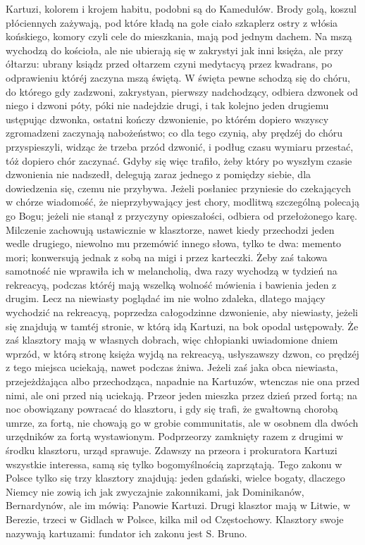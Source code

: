 \documentclass{book}
\begin{document}
Kartuzi, kolorem i krojem habitu, podobni są do Kamedułów. Brody golą, koszul płóciennych zażywają, pod które kładą na gołe ciało szkaplerz ostry z włósia końskiego, komory czyli cele do mieszkania, mają pod jednym dachem. Na mszą wychodzą do kościoła, ale nie ubierają się w zakrystyi jak inni księża, ale przy ółtarzu: ubrany ksiądz przed ołtarzem czyni medytacyą przez kwadrans, po odprawieniu któréj zaczyna mszą świętą. W święta pewne schodzą się do chóru, do którego gdy zadzwoni, zakrystyan, pierwszy nadchodzący, odbiera dzwonek od niego i dzwoni póty, póki nie nadejdzie drugi, i tak kolejno jeden drugiemu ustępując dzwonka, ostatni kończy dzwonienie, po którém dopiero wszyscy zgromadzeni zaczynają nabożeństwo; co dla tego czynią, aby prędzéj do chóru przyspieszyli, widząc że trzeba przód dzwonić, i podług czasu wymiaru przestać, tóż dopiero chór zaczynać. Gdyby się więc trafiło, żeby który po wyszłym czasie dzwonienia nie nadszedł, delegują zaraz jednego z pomiędzy siebie, dla dowiedzenia się, czemu nie przybywa. Jeżeli posłaniec przyniesie do czekających w chórze wiadomość, że nieprzybywający jest chory, modlitwą szczególną polecają go Bogu; jeżeli nie stanął z przyczyny opieszałości, odbiera od przełożonego karę. Milczenie zachowują ustawicznie w klasztorze, nawet kiedy przechodzi jeden wedle drugiego, niewolno mu przemówić innego słowa, tylko te dwa: memento mori; konwersują jednak z sobą na migi i przez karteczki. Żeby zaś takowa samotność nie wprawiła ich w melancholią, dwa razy wychodzą w tydzień na rekreacyą, podczas któréj mają wszelką wolność mówienia i bawienia jeden z drugim. Lecz na niewiasty poglądać im nie wolno zdaleka, dlatego mający wychodzić na rekreacyą, poprzedza całogodzinne dzwonienie, aby niewiasty, jeżeli się znajdują w tamtéj stronie, w którą idą Kartuzi, na bok opodal ustępowały. Że zaś klasztory mają w własnych dobrach, więc chłopianki uwiadomione dniem wprzód, w którą stronę księża wyjdą na rekreacyą, usłyszawszy dzwon, co prędzéj z tego miejsca uciekają, nawet podczas żniwa. Jeżeli zaś jaka obca niewiasta, przejeżdżająca albo przechodząca, napadnie na Kartuzów, wtenczas nie ona przed nimi, ale oni przed nią uciekają. Przeor jeden mieszka przez dzień przed fortą; na noc obowiązany powracać do klasztoru, i gdy się trafi, że gwałtowną chorobą umrze, za fortą, nie chowają go w grobie communitatis, ale w osobnem dla dwóch urzędników za fortą wystawionym. Podprzeorzy zamknięty razem z drugimi w środku klasztoru, urząd sprawuje. Zdawszy na przeora i prokuratora Kartuzi wszystkie interessa, samą się tylko bogomyślnością zaprzątają. Tego zakonu w Polsce tylko się trzy klasztory znajdują: jeden gdański, wielce bogaty, dlaczego Niemcy nie zowią ich jak zwyczajnie zakonnikami, jak Dominikanów, Bernardynów, ale im mówią: Panowie Kartuzi. Drugi klasztor mają w Litwie, w Berezie, trzeci w Gidlach w Polsce, kilka mil od Częstochowy. Klasztory swoje nazywają kartuzami: fundator ich zakonu jest S. Bruno.
\end{document}
